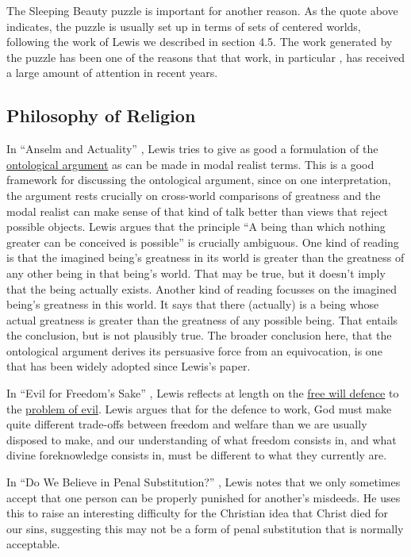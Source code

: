 The Sleeping Beauty puzzle is important for another reason. As the quote above indicates, the puzzle is usually set up in terms of sets of centered worlds, following the work of Lewis we described in section 4.5. The work generated by the puzzle has been one of the reasons that that work, in particular \citeyearpar{Lewis1979b}, has received a large amount of attention in recent years.

\subsection{Philosophy of Religion} 
In ``Anselm and Actuality'' \citeyearpar{Lewis1970a}, Lewis tries to give as good a formulation of the \href{http://plato.stanford.edu/ontological-arguments/}{ontological argument} as can be made in modal realist terms. This is a good framework for discussing the ontological argument, since on one interpretation, the argument rests crucially on cross-world comparisons of greatness and the modal realist can make sense of that kind of talk better than views that reject possible objects. Lewis argues that the principle ``A being than which nothing greater can be conceived is possible'' is crucially ambiguous. One kind of reading is that the imagined being's greatness in its world is greater than the greatness of any other being in that being's world. That may be true, but it doesn't imply that the being actually exists. Another kind of reading focusses on the imagined being's greatness in this world. It says that there (actually) is a being whose actual greatness is greater than the greatness of any possible being. That entails the conclusion, but is not plausibly true. The broader conclusion here, that the ontological argument derives its persuasive force from an equivocation, is one that has been widely adopted since Lewis's paper.

In ``Evil for Freedom's Sake'' \citeyearpar{Lewis1993b}, Lewis reflects at length on the \href{http://plato.stanford.edu/evil/index.html#FreWil}{free will defence} to the \href{http://plato.stanford.edu/evil/}{problem of evil}. Lewis argues that for the defence to work, God must make quite different trade-offs between freedom and welfare than we are usually disposed to make, and our understanding of what freedom consists in, and what divine foreknowledge consists in, must be different to what they currently are.

In ``Do We Believe in Penal Substitution?'' \citeyearpar{Lewis1997a}, Lewis notes that we only sometimes accept that one person can be properly punished for another's misdeeds. He uses this to raise an interesting difficulty for the Christian idea that Christ died for our sins, suggesting this may not be a form of penal substitution that is normally acceptable.

